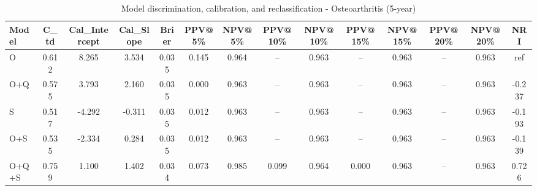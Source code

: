 \begin{table}[htbp]
\centering
\small
\caption{Model discrimination, calibration, and reclassification - Osteoarthritis (5-year)}
\label{tab:perf_osteoarthritis_5y}
\begin{tabular}{lccccccccccccc}
\toprule
Model & C\_td & Cal\_Intercept & Cal\_Slope & Brier & PPV@5\% & NPV@5\% & PPV@10\% & NPV@10\% & PPV@15\% & NPV@15\% & PPV@20\% & NPV@20\% & NRI \\
\midrule
O & 0.612 & 8.265 & 3.534 & 0.035 & 0.145 & 0.964 & -- & 0.963 & -- & 0.963 & -- & 0.963 & ref \\
O+Q & 0.575 & 3.793 & 2.160 & 0.035 & 0.000 & 0.963 & -- & 0.963 & -- & 0.963 & -- & 0.963 & -0.237 \\
S & 0.517 & -4.292 & -0.311 & 0.035 & 0.012 & 0.963 & -- & 0.963 & -- & 0.963 & -- & 0.963 & -0.193 \\
O+S & 0.535 & -2.334 & 0.284 & 0.035 & 0.012 & 0.963 & -- & 0.963 & -- & 0.963 & -- & 0.963 & -0.139 \\
O+Q+S & 0.759 & 1.100 & 1.402 & 0.034 & 0.073 & 0.985 & 0.099 & 0.964 & 0.000 & 0.963 & -- & 0.963 & 0.726 \\
\bottomrule
\end{tabular}
\end{table}